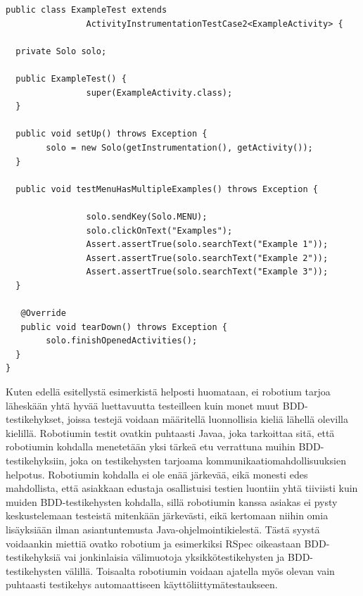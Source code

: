 \documentclass[finnish,nonumbib,nocopyright]{gradu2}
\begin{document}
\begin{verbatim}
public class ExampleTest extends
                ActivityInstrumentationTestCase2<ExampleActivity> {

  private Solo solo;

  public ExampleTest() {
                super(ExampleActivity.class);
  }

  public void setUp() throws Exception {
        solo = new Solo(getInstrumentation(), getActivity());
  }
  
  public void testMenuHasMultipleExamples() throws Exception {
  
                solo.sendKey(Solo.MENU);
                solo.clickOnText("Examples");
                Assert.assertTrue(solo.searchText("Example 1"));
                Assert.assertTrue(solo.searchText("Example 2"));
                Assert.assertTrue(solo.searchText("Example 3"));
  }

   @Override
   public void tearDown() throws Exception {
        solo.finishOpenedActivities();
  }
}
\end{verbatim}

Kuten edellä esitellystä esimerkistä helposti huomataan, ei robotium tarjoa läheskään yhtä hyvää luettavuutta testeilleen kuin monet muut BDD-testikehykset, joissa testejä voidaan määritellä luonnollisia kieliä lähellä olevilla kielillä. Robotiumin testit ovatkin puhtaasti Javaa, joka tarkoittaa sitä, että robotiumin kohdalla menetetään yksi tärkeä etu verrattuna muihin BDD-testikehyksiin, joka on testikehysten tarjoama kommunikaatiomahdollisuuksien helpotus. Robotiumin kohdalla ei ole enää järkevää, eikä monesti edes mahdollista, että asiakkaan edustaja osallistuisi testien luontiin yhtä tiiviisti kuin muiden BDD-testikehysten kohdalla, sillä robotiumin kanssa asiakas ei pysty keskustelemaan testeistä mitenkään järkevästi, eikä kertomaan niihin omia lisäyksiään ilman asiantuntemusta Java-ohjelmointikielestä. Tästä syystä voidaankin miettiä ovatko robotium ja esimerkiksi RSpec \cite{rspec} oikeastaan BDD-testikehyksiä vai jonkinlaisia välimuotoja yksikkötestikehysten ja BDD-testikehysten välillä. Toisaalta robotiumin voidaan ajatella myös olevan vain puhtaasti testikehys automaattiseen käyttöliittymätestaukseen.
\end{document}
